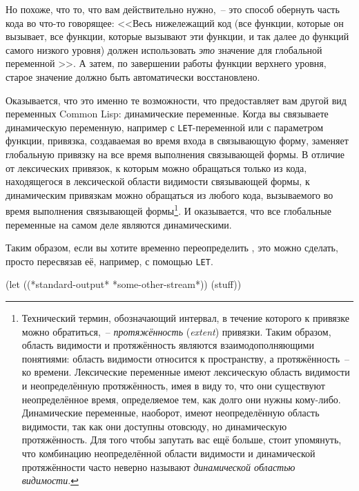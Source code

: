 Но похоже, что то, что вам действительно нужно,~-- это способ обернуть часть кода во что-то
говорящее: <<Весь нижележащий код (все функции, которые он вызывает, все функции, которые
вызывают эти функции, и так далее до функций самого низкого уровня) должен использовать
\textit{это} значение для глобальной переменной >>. А затем, по завершении
работы функции верхнего уровня, старое значение  должно быть
автоматически восстановлено.

Оказывается, что это именно те возможности, что предоставляет вам другой вид переменных
Common Lisp: динамические переменные. Когда вы связываете динамическую переменную,
например с \lstinline{LET}-переменной или с параметром функции, привязка, создаваемая во
время входа в связывающую форму, заменяет глобальную привязку на все время выполнения
связывающей формы. В отличие от лексических привязок, к которым можно обращаться только из
кода, находящегося в лексической области видимости связывающей формы, к динамическим
привязкам можно обращаться из любого кода, вызываемого во время выполнения связывающей
формы\footnote{Технический термин, обозначающий интервал, в течение которого к привязке
  можно обратиться,~-- \textit{протяжённость} (\textit{extent}) привязки. Таким образом,
  область видимости и протяжённость являются взаимодополняющими понятиями: область
  видимости относится к пространству, а протяжённость~-- ко времени. Лексические
  переменные имеют лексическую область видимости и неопределённую протяжённость, имея
  в виду то, что они существуют неопределённое время, определяемое тем, как долго они нужны
  кому-либо. Динамические переменные, наоборот, имеют неопределённую область видимости,
  так как они доступны отовсюду, но динамическую протяжённость. Для того чтобы запутать
  вас ещё больше, стоит упомянуть, что комбинацию неопределённой области видимости и
  динамической протяжённости часто неверно называют \textit{динамической областью
    видимости}.}. И оказывается, что все глобальные переменные на самом деле являются
динамическими.

Таким образом, если вы хотите временно переопределить , это можно
сделать, просто пересвязав её, например, с помощью \lstinline{LET}.

\begin{myverb}
  (let ((*standard-output* *some-other-stream*))
    (stuff))
\end{myverb}

